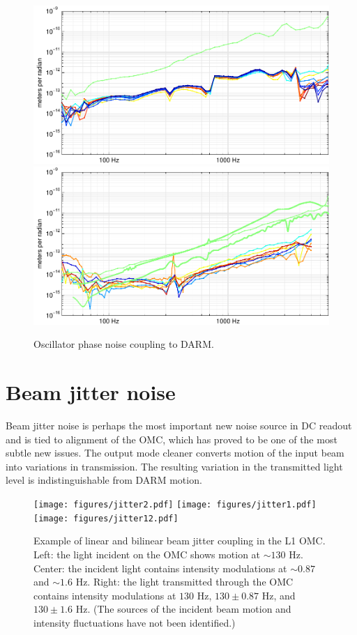 \begin{figure} %
\includegraphics[]{figures/oscPM-L1.pdf}
\includegraphics[]{figures/oscPM-H1.pdf}
\caption[Oscillator phase noise coupling (measured)]{\label{fig:osc-PM}Oscillator phase noise coupling to DARM.}
\end{figure}

\section{Beam jitter noise}

Beam jitter noise is perhaps the most important new noise source in
DC readout and is tied to alignment of the OMC, which has proved to
be one of the most subtle new issues. The output mode cleaner converts
motion of the input beam into variations in transmission. The resulting
variation in the transmitted light level is indistinguishable from
DARM motion.

\begin{figure}[t]
\texttt{[image: figures/jitter2.pdf]}
\texttt{[image: figures/jitter1.pdf]}
\texttt{[image: figures/jitter12.pdf]}
\caption[Example of linear and bilinear beam jitter
  coupling]{\label{fig:jitter-mechanism}Example of linear and bilinear
  beam jitter coupling in the L1 OMC.  Left: the light incident on the
  OMC shows motion at $\sim 130$ Hz.  Center: the incident light
  contains intensity modulations at $\sim 0.87$ and $\sim 1.6$
  Hz. Right: the light transmitted through the OMC contains intensity
  modulations at $130$ Hz, $130 \pm 0.87$ Hz, and $ 130 \pm 1.6$ Hz.
  (The sources of the incident beam motion and intensity fluctuations
  have not been identified.)}
\end{figure}

